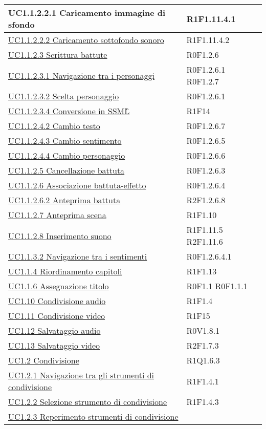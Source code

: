 \begin{center}
\begin{longtable}{| p{10.25cm} | p{2.5cm} | }
UC1.1.2.2.1 Caricamento immagine di sfondo } &  R1F1.11.4.1  \\ \hline  \hyperref[sec:UC1.1.2.2.2]{ UC1.1.2.2.2 Caricamento sottofondo sonoro } &  R1F1.11.4.2  \\ \hline  \hyperref[sec:UC1.1.2.3]{ UC1.1.2.3 Scrittura battute } &  R0F1.2.6  \\ \hline  \hyperref[sec:UC1.1.2.3.1]{ UC1.1.2.3.1 Navigazione tra i personaggi } &  R0F1.2.6.1  \newline R0F1.2.7  \\ \hline  \hyperref[sec:UC1.1.2.3.2]{ UC1.1.2.3.2 Scelta personaggio } &  R0F1.2.6.1  \\ \hline  \hyperref[sec:UC1.1.2.3.4]{ UC1.1.2.3.4 Conversione in SSML\G  } &  R1F14  \\ \hline  \hyperref[sec:UC1.1.2.4.2]{ UC1.1.2.4.2 Cambio testo } &  R0F1.2.6.7  \\ \hline  \hyperref[sec:UC1.1.2.4.3]{ UC1.1.2.4.3 Cambio sentimento } &  R0F1.2.6.5  \\ \hline  \hyperref[sec:UC1.1.2.4.4]{ UC1.1.2.4.4 Cambio personaggio } &  R0F1.2.6.6  \\ \hline  \hyperref[sec:UC1.1.2.5]{ UC1.1.2.5 Cancellazione battuta } &  R0F1.2.6.3  \\ \hline  \hyperref[sec:UC1.1.2.6]{ UC1.1.2.6 Associazione battuta-effetto } &  R0F1.2.6.4  \\ \hline  \hyperref[sec:UC1.1.2.6.2]{ UC1.1.2.6.2 Anteprima battuta } &  R2F1.2.6.8  \\ \hline  \hyperref[sec:UC1.1.2.7]{ UC1.1.2.7 Anteprima scena } &  R1F1.10  \\ \hline  \hyperref[sec:UC1.1.2.8]{ UC1.1.2.8 Inserimento suono } &  R1F1.11.5  \newline R2F1.11.6  \\ \hline  \hyperref[sec:UC1.1.3.2]{ UC1.1.3.2 Navigazione tra i sentimenti } &  R0F1.2.6.4.1  \\ \hline  \hyperref[sec:UC1.1.4]{ UC1.1.4 Riordinamento capitoli } &  R1F1.13  \\ \hline  \hyperref[sec:UC1.1.6]{ UC1.1.6 Assegnazione titolo } &  R0F1.1  \newline R0F1.1.1  \\ \hline  \hyperref[sec:UC1.10]{ UC1.10 Condivisione audio } &  R1F1.4  \\ \hline  \hyperref[sec:UC1.11]{ UC1.11 Condivisione video } &  R1F15  \\ \hline  \hyperref[sec:UC1.12]{ UC1.12 Salvataggio audio } &  R0V1.8.1  \\ \hline  \hyperref[sec:UC1.13]{ UC1.13 Salvataggio video  } &  R2F1.7.3  \\ \hline  \hyperref[sec:UC1.2]{ UC1.2 Condivisione } &  R1Q1.6.3  \\ \hline  \hyperref[sec:UC1.2.1]{ UC1.2.1 Navigazione tra gli strumenti di condivisione } &  R1F1.4.1  \\ \hline  \hyperref[sec:UC1.2.2]{ UC1.2.2 Selezione strumento di condivisione } &  R1F1.4.3  \\ \hline  \hyperref[sec:UC1.2.3]{ UC1.2.3 Reperimento strumenti di condivisione } &  
\end{longtable}
\end{center}
